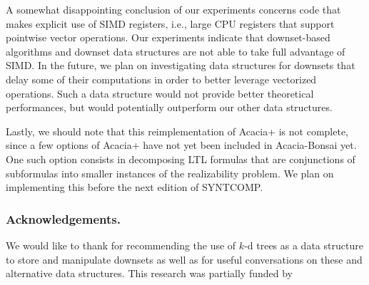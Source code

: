 \documentclass[runningheads,a4paper]{llncs}
\begin{document}
A somewhat disappointing conclusion of our experiments concerns code that makes
explicit use of SIMD registers, i.e., large CPU registers that support pointwise
vector operations.  Our experiments indicate that downset-based algorithms and
downset data structures are not able to take full advantage of SIMD.  In the
future, we plan on investigating data structures for downsets that delay some of
their computations in order to better leverage vectorized operations.  Such a
data structure would not provide better theoretical performances, but would
potentially outperform our other data structures.

Lastly, we should note that this reimplementation of Acacia+ is not complete,
since a few options of Acacia+ have not yet been included in Acacia-Bonsai yet.
One such option consists in decomposing LTL formulas that are conjunctions of
subformulas into smaller instances of the realizability problem.  We plan on
implementing this before the next edition of SYNTCOMP.

\subsubsection*{Acknowledgements.}
We would like to thank  for recommending the use of
\(k\)-d trees as a data structure to store and manipulate downsets as well as
 for useful conversations on these and alternative data
structures.  This research was partially funded by 



\end{document}
